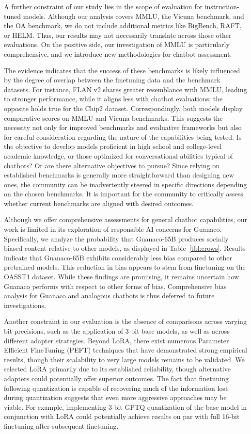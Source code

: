 A further constraint of our study lies in the scope of evaluation for instruction-tuned models. Although our analysis covers MMLU, the Vicuna benchmark, and the OA benchmark, we do not include additional metrics like BigBench, RAFT, or HELM. Thus, our results may not necessarily translate across those other evaluations. On the positive side, our investigation of MMLU is particularly comprehensive, and we introduce new methodologies for chatbot assessment.

The evidence indicates that the success of these benchmarks is likely influenced by the degree of overlap between the finetuning data and the benchmark datasets. For instance, FLAN v2 shares greater resemblance with MMLU, leading to stronger performance, while it aligns less with chatbot evaluations; the opposite holds true for the Chip2 dataset. Correspondingly, both models display comparative scores on MMLU and Vicuna benchmarks. This suggests the necessity not only for improved benchmarks and evaluative frameworks but also for careful consideration regarding the nature of the capabilities being tested. Is the objective to develop models proficient in high school and college-level academic knowledge, or those optimized for conversational abilities typical of chatbots? Or are there alternative objectives to pursue? Since relying on established benchmarks is generally more straightforward than designing new ones, the community can be inadvertently steered in specific directions depending on the chosen benchmarks. It is important for the community to critically assess whether current benchmarks are aligned with desired outcomes.

Although we offer comprehensive assessments for general chatbot capabilities, our work is limited in its exploration of responsible AI concerns for {Guanaco}. Specifically, we analyze the probability that {Guanaco}-65B produces socially biased content relative to other models, as displayed in Table~\ref{tbl:crows}. Results indicate that {Guanaco}-65B exhibits considerably less bias compared to other pretrained models. This reduction in bias appears to stem from finetuning on the OASST1 dataset. While these findings are promising, it remains uncertain how {Guanaco} performs with respect to other forms of bias. Comprehensive bias analysis for {Guanaco} and analogous chatbots is thus deferred to future investigations.

Another constraint in our evaluation is the absence of comparisons across varying bit-precisions, such as the application of 3-bit base models, as well as across different adapter strategies. Beyond LoRA, there exist numerous Parameter Efficient FineTuning (PEFT) techniques that have demonstrated strong empirical results, though their scalability to very large models remains to be validated. We selected LoRA primarily due to its established reliability, though alternative adapters could potentially offer superior outcomes. The fact that finetuning following quantization is capable of recovering much of the information lost during quantization suggests that even more aggressive approaches may be viable. For example, implementing 3-bit GPTQ quantization of the base model in conjunction with LoRA could potentially achieve results on par with full 16-bit finetuning after subsequent finetuning.

